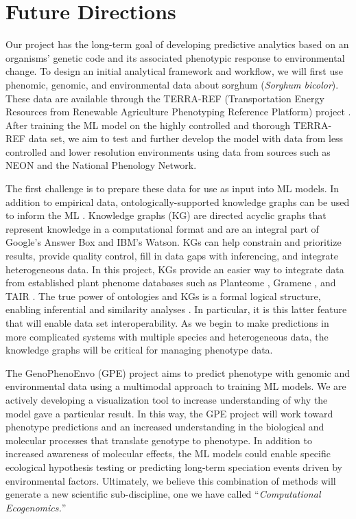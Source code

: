 \documentclass[12pt,]{article}
\begin{document}
\hypertarget{future-directions}{%
\section{Future Directions}\label{future-directions}}

Our project has the long-term goal of developing predictive analytics
based on an organisms' genetic code and its associated phenotypic
response to environmental change. To design an initial analytical
framework and workflow, we will first use phenomic, genomic, and
environmental data about sorghum (\emph{Sorghum bicolor}). These data
are available through the TERRA-REF (Transportation Energy Resources
from Renewable Agriculture Phenotyping Reference Platform) project
\citep{lebauer2020data, burnette2018terra}. After training the ML model
on the highly controlled and thorough TERRA-REF data set, we aim to test
and further develop the model with data from less controlled and lower
resolution environments using data from sources such as NEON and the
National Phenology Network.

The first challenge is to prepare these data for use as input into ML
models. In addition to empirical data, ontologically-supported knowledge
graphs can be used to inform the ML \citep{mungall2017monarch}.
Knowledge graphs (KG) are directed acyclic graphs that represent
knowledge in a computational format and are an integral part of Google's
Answer Box and IBM's Watson. KGs can help constrain and prioritize
results, provide quality control, fill in data gaps with inferencing,
and integrate heterogeneous data. In this project, KGs provide an easier
way to integrate data from established plant phenome databases such as
Planteome \citep{cooper2018planteome}, Gramene
\citep{jaiswal_gramene_2011}, and TAIR \citep{poole_tair_2007}. The true
power of ontologies and KGs is a formal logical structure, enabling
inferential and similarity analyses
\citep{mungall2017monarch, washington2009linking}. In particular, it is
this latter feature that will enable data set interoperability. As we
begin to make predictions in more complicated systems with multiple
species and heterogeneous data, the knowledge graphs will be critical
for managing phenotype data.

The GenoPhenoEnvo (GPE) project aims to predict phenotype with genomic
and environmental data using a multimodal approach to training ML
models. We are actively developing a visualization tool to increase
understanding of why the model gave a particular result. In this way,
the GPE project will work toward phenotype predictions and an increased
understanding in the biological and molecular processes that translate
genotype to phenotype. In addition to increased awareness of molecular
effects, the ML models could enable specific ecological hypothesis
testing or predicting long-term speciation events driven by
environmental factors. Ultimately, we believe this combination of
methods will generate a new scientific sub-discipline, one we have
called ``\emph{Computational Ecogenomics.}''
\end{document}
